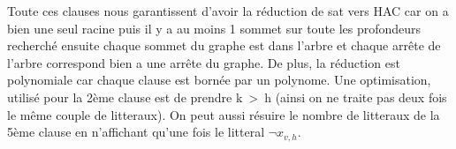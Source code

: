 \documentclass[10pt, a4paper]{article}
\begin{document}
Toute ces clauses nous garantissent d'avoir la réduction de sat vers HAC car on a bien une seul racine puis il y a au moins 1 sommet sur toute les profondeurs recherché ensuite chaque sommet du graphe est dans l'arbre et chaque arrête de l'arbre correspond bien a une arrête du graphe.\newline
De plus, la réduction est polynomiale car chaque clause est bornée par un polynome.\newline
Une optimisation, utilisé pour la 2ème clause est de prendre k~>~h (ainsi on ne traite pas deux fois le même couple de litteraux). On peut aussi résuire le nombre de litteraux de la 5ème clause en n'affichant qu'une fois le litteral $\neg x_{v,h}$.
\end{document}

